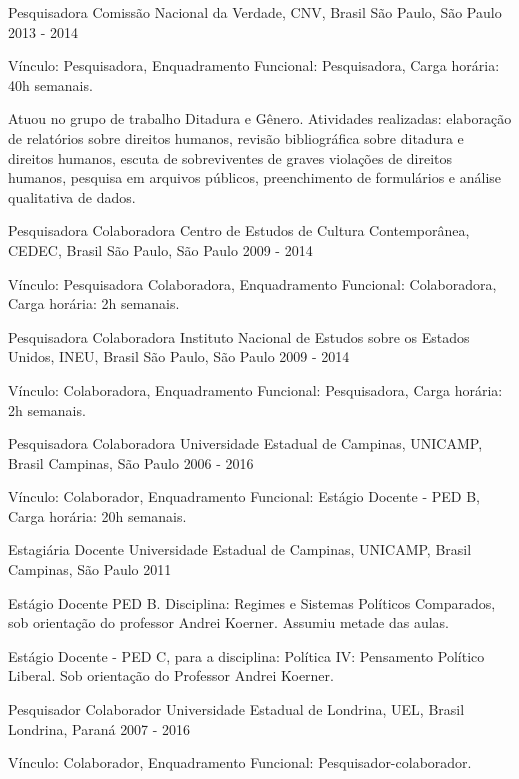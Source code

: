 
\begin{cventries}

\cventry
{Pesquisadora}
{Comissão Nacional da Verdade, CNV, Brasil}
{São Paulo, São Paulo}
{2013 - 2014}
{
\begin{cvitems}
  \item Vínculo: Pesquisadora, Enquadramento Funcional: Pesquisadora, Carga horária: 40h semanais.
  \item Atuou no grupo de trabalho Ditadura e Gênero. Atividades realizadas: elaboração de relatórios sobre direitos humanos, revisão bibliográfica sobre ditadura e direitos humanos, escuta de sobreviventes de graves violações de direitos humanos, pesquisa em arquivos públicos, preenchimento de formulários e análise qualitativa de dados.
\end{cvitems}
}

\cventry
{Pesquisadora Colaboradora}
{Centro de Estudos de Cultura Contemporânea, CEDEC, Brasil}
{São Paulo, São Paulo}
{2009 - 2014}
{
\begin{cvitems}
  \item Vínculo: Pesquisadora Colaboradora, Enquadramento Funcional: Colaboradora, Carga horária: 2h semanais.
\end{cvitems}
}

\cventry
{Pesquisadora Colaboradora}
{Instituto Nacional de Estudos sobre os Estados Unidos, INEU, Brasil}
{São Paulo, São Paulo}
{2009 - 2014}
{
\begin{cvitems}
  \item Vínculo: Colaboradora, Enquadramento Funcional: Pesquisadora, Carga horária: 2h semanais.
\end{cvitems}
}

\cventry
{Pesquisadora Colaboradora}
{Universidade Estadual de Campinas, UNICAMP, Brasil}
{Campinas, São Paulo}
{2006 - 2016}
{
\begin{cvitems}
  \item Vínculo: Colaborador, Enquadramento Funcional: Estágio Docente - PED B, Carga horária: 20h semanais.
\end{cvitems}
}

\cventry
{Estagiária Docente}
{Universidade Estadual de Campinas, UNICAMP, Brasil}
{Campinas, São Paulo}
{2011}
{
\begin{cvitems}
  \item Estágio Docente PED B. Disciplina: Regimes e Sistemas Políticos Comparados, sob orientação do professor Andrei Koerner. Assumiu metade das aulas.
  \item Estágio Docente - PED C, para a disciplina: Política IV: Pensamento Político Liberal. Sob orientação do Professor Andrei Koerner.
\end{cvitems}
}

\cventry
{Pesquisador Colaborador}
{Universidade Estadual de Londrina, UEL, Brasil}
{Londrina, Paraná}
{2007 - 2016}
{
\begin{cvitems}
  \item Vínculo: Colaborador, Enquadramento Funcional: Pesquisador-colaborador.
\end{cvitems}
}

\end{cventries}
